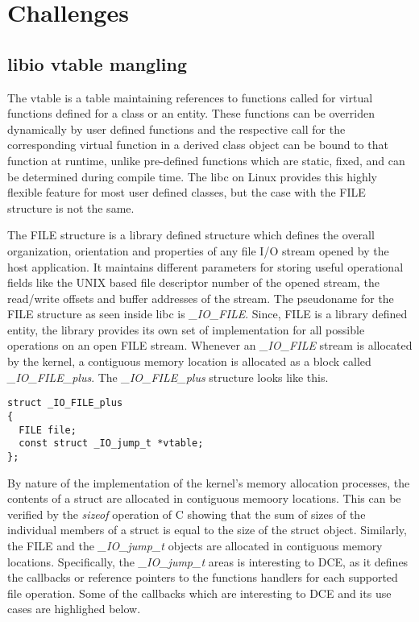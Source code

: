\documentclass{sig-alternate}
\begin{document}
\section{Challenges}

\subsection{libio vtable mangling}
The vtable is a table maintaining references to functions called for virtual functions defined for a class or an entity. These functions can 
be overriden dynamically by user defined functions and the respective call for the corresponding virtual function in a derived class object can be bound 
to that function at runtime, unlike pre-defined functions which are static, fixed, and can be determined during compile time. The libc on Linux provides
this highly flexible feature for most user defined classes, but the case with the FILE structure is not the same.

The FILE structure is a library defined structure which defines the overall organization, orientation and properties of any file I/O stream opened
by the host application. It maintains different parameters for storing useful operational fields like the UNIX based file descriptor number of the 
opened stream, the read/write offsets and buffer addresses of the stream. The pseudoname for the FILE structure as seen inside libc is \textit{\_IO\_FILE}. 
Since, FILE is a library defined entity, the library provides its own set of implementation for all possible operations on an open FILE stream.
Whenever an \textit{\_IO\_FILE} stream is allocated by the kernel, a contiguous memory location is allocated as a block called \textit{\_IO\_FILE\_plus}. 
The \textit{\_IO\_FILE\_plus} structure looks like this.

\begin{lstlisting}[style=CStyle]     
struct _IO_FILE_plus
{
  FILE file;
  const struct _IO_jump_t *vtable;
};
\end{lstlisting}

By nature of the implementation of the kernel's memory allocation processes, the contents of a struct are allocated in contiguous memoory locations. 
This can be verified by the \textit{sizeof} operation of C showing that the sum of sizes of the individual members of a struct is equal to the size of
the struct object. Similarly, the FILE and the \textit{\_IO\_jump\_t} objects are allocated in contiguous memory locations. Specifically, the 
\textit{\_IO\_jump\_t} areas is interesting to DCE, as it defines the callbacks or reference pointers to the functions handlers for each supported file 
operation. Some of the callbacks which are interesting to DCE and its use cases are highlighed below.
\end{document}
